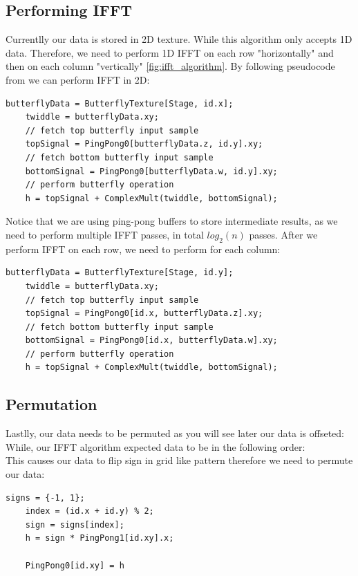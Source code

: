 \subsection{Performing IFFT}
Currentlly our data is stored in 2D texture. While this algorithm only accepts 1D data. Therefore, we need to perform 1D IFFT on each row "horizontally" and then on each column "vertically" \ref{fig:ifft_algorithm}.
By following pseudocode from \cite{flugge2017} we can perform IFFT in 2D:

\begin{lstlisting}[caption={Horizontal Butterfly Operation}, frame=single, numberstyle=\small\color{gray}, captionpos=b]
    butterflyData = ButterflyTexture[Stage, id.x];
    twiddle = butterflyData.xy;
    // fetch top butterfly input sample
    topSignal = PingPong0[butterflyData.z, id.y].xy;
    // fetch bottom butterfly input sample
    bottomSignal = PingPong0[butterflyData.w, id.y].xy;
    // perform butterfly operation
    h = topSignal + ComplexMult(twiddle, bottomSignal);
\end{lstlisting}

Notice that we are using ping-pong buffers to store intermediate results, as we need to perform multiple IFFT passes, in total $log_2(n)$ passes.
After we perform IFFT on each row, we need to perform for each column:
\begin{lstlisting}[caption={Vertical Butterfly Operation}, frame=single, numberstyle=\small\color{gray}, captionpos=b]
    butterflyData = ButterflyTexture[Stage, id.y];
    twiddle = butterflyData.xy;
    // fetch top butterfly input sample
    topSignal = PingPong0[id.x, butterflyData.z].xy;
    // fetch bottom butterfly input sample
    bottomSignal = PingPong0[id.x, butterflyData.w].xy;
    // perform butterfly operation
    h = topSignal + ComplexMult(twiddle, bottomSignal);
\end{lstlisting}

\subsection*{Permutation}
Lastlly, our data needs to be permuted as you will see later our data is offseted:
\begin{equation}
    [\text{freq} (-N / 2), \text{ ...}, \text{ freq} (-1), \text{ freq} (0), \text{ freq} (1), \text{ ...}, \text{ freq} (N / 2 - 1)]
\end{equation}
While, our IFFT algorithm expected data to be in the following order:
\begin{equation}
    [\text{freq} (0), \text{ freq} (1), \text{ ...}, \text{ freq}(N - 1)]
\end{equation}
This causes our data to flip sign in grid like pattern therefore we need to permute our data:
\begin{lstlisting}[caption={Data Permutation \cite{flugge2017} }, frame=single, numberstyle=\small\color{gray}, captionpos=b]
    signs = {-1, 1};
    index = (id.x + id.y) % 2;
    sign = signs[index];
    h = sign * PingPong1[id.xy].x;
    
    PingPong0[id.xy] = h
\end{lstlisting}

